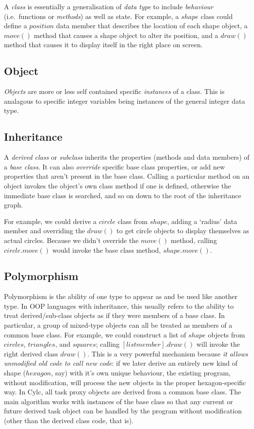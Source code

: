 \documentclass[11pt,a4paper]{article}
\begin{document}
A {\em class} is essentially a generalisation of {\em data type} to
include {\em behaviour} (i.e.\ functions or {\em methods}) as well as
state. For example, a $shape$ class could define a $position$ data
member that describes the location of each shape object, a $move()$
method that causes a shape object to alter its position, and a $draw()$
method that causes it to display itself in the right place on screen.

\subsection{Object}

{\em Objects} are more or less self contained specific {\em instances}
of a class. This is analagous to specific integer variables being 
instances of the general integer data type.

\subsection{Inheritance}

A {\em derived class} or {\em subclass} inherits the properties (methods
and data members) of a {\em base class}. It can also {\em override}
specific base class properties, or add new properties that aren't
present in the base class. Calling a particular method on an object
invokes the object's own class method if one is defined, otherwise the
immediate base class is searched, and so on down to the root of the
inheritance graph. 

For example, we could derive a $circle$ class from $shape$, adding a
`radius' data member and overriding the $draw()$ to get circle objects
to display themselves as actual circles.  Because we didn't override the
$move()$ method, calling $circle.move()$ would invoke the base class
method, $shape.move()$. 


\subsection{Polymorphism}

Polymorphism is the ability of one type to appear as and be used like
another type.  In OOP languages with inheritance, this usually refers to
the ability to treat derived/sub-class objects as if they were members
of a base class.  In particular, a group of mixed-type objects can all
be treated as members of a common base class. For example, we could
construct a list of $shape$ objects from $circles$, $triangles$, and
$squares$; calling $[list member].draw()$ will invoke the right derived
class $draw()$. This is a very powerful mechanism because {\em it allows
unmodified old code to call new code}: if we later derive an entirely
new kind of shape ($hexagon$, say) with it's own unique behaviour, the
existing program, without modification, will process the new objects in
the proper hexagon-specific way.  In Cylc, all task proxy objects are
derived from a common base class. The main algorithm works with
instances of the base class so that any current or future derived task
object can be handled by the program without modification (other than
the derived class code, that is).
\end{document}
